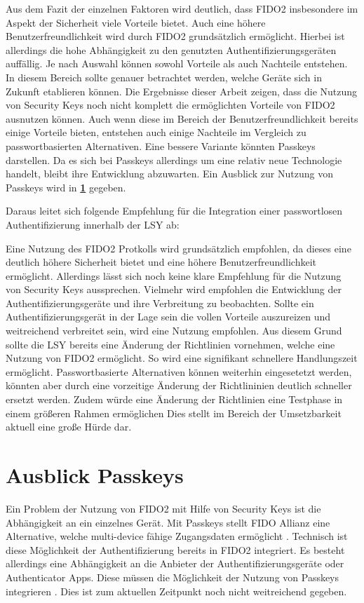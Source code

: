 Aus dem Fazit der einzelnen Faktoren wird deutlich, dass FIDO2 insbesondere im Aspekt der Sicherheit viele Vorteile bietet. Auch eine höhere Benutzerfreundlichkeit wird durch FIDO2 grundsätzlich ermöglicht. Hierbei ist allerdings die hohe Abhängigkeit zu den genutzten Authentifizierungsgeräten auffällig. Je nach Auswahl können sowohl Vorteile als auch Nachteile entstehen. In diesem Bereich sollte genauer betrachtet werden, welche Geräte sich in Zukunft etablieren können. Die Ergebnisse dieser Arbeit zeigen, dass die Nutzung von Security Keys noch nicht komplett die ermöglichten Vorteile von FIDO2 ausnutzen können. Auch wenn diese im Bereich der Benutzerfreundlichkeit bereits einige Vorteile bieten, entstehen auch einige Nachteile im Vergleich zu passwortbasierten Alternativen. Eine bessere Variante könnten Passkeys darstellen. Da es sich bei Passkeys allerdings um eine relativ neue Technologie handelt, bleibt ihre Entwicklung abzuwarten. Ein Ausblick zur Nutzung von Passkeys wird in \textbf{\ref{passkeys}} gegeben.

Daraus leitet sich folgende Empfehlung für die Integration einer passwortlosen Authentifizierung innerhalb der \ac{LSY} ab:

Eine Nutzung des FIDO2 Protkolls wird grundsätzlich empfohlen, da dieses eine deutlich höhere Sicherheit bietet und eine höhere Benutzerfreundlichkeit ermöglicht. Allerdings lässt sich noch keine klare Empfehlung für die Nutzung von Security Keys aussprechen. Vielmehr wird empfohlen die Entwicklung der Authentifizierungsgeräte und ihre Verbreitung zu beobachten. Sollte ein Authentifizierungsgerät in der Lage sein die vollen Vorteile auszureizen und weitreichend verbreitet sein, wird eine Nutzung empfohlen. Aus diesem Grund sollte die \ac{LSY} bereits eine Änderung der Richtlinien vornehmen, welche eine Nutzung von FIDO2 ermöglicht. So wird eine signifikant schnellere Handlungszeit ermöglicht. Passwortbasierte Alternativen können weiterhin eingesetetzt werden, könnten aber durch eine vorzeitige Änderung der Richtlininien deutlich schneller ersetzt werden. Zudem würde eine Änderung der Richtlinien eine Testphase in einem größeren Rahmen ermöglichen Dies stellt im Bereich der Umsetzbarkeit aktuell eine große Hürde dar.


\chapter{Ausblick Passkeys} \label{passkeys}
Ein Problem der Nutzung von FIDO2 mit Hilfe von Security Keys ist die Abhängigkeit an ein einzelnes Gerät. Mit Passkeys stellt FIDO Allianz eine Alternative, welche multi-device fähige Zugangsdaten ermöglicht \cite{usecasfido}.
Technisch ist diese Möglichkeit der Authentifizierung bereits in \ac{FIDO}2 integriert. Es besteht allerdings eine Abhängigkeit an die Anbieter der Authentifizierungsgeräte oder Authenticator Apps. Diese müssen die Möglichkeit der Nutzung von Passkeys integrieren \cite{usecasfido}. Dies ist zum aktuellen Zeitpunkt noch nicht weitreichend gegeben.

